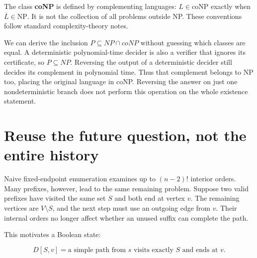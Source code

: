 The class \textbf{coNP} is defined by complementing languages:
\(L\in\mathrm{coNP}\) exactly when \(\overline L\in\mathrm{NP}\). It is
not the collection of all problems outside NP. These conventions follow standard
complexity-theory notes.\cite{TorontoLecture3}

We can derive the inclusion \(P\subseteq NP\cap coNP\) without guessing
which classes are equal. A deterministic polynomial-time decider is also
a verifier that ignores its certificate, so \(P\subseteq NP\). Reversing
the output of a deterministic decider still decides its complement in
polynomial time. Thus that complement belongs to NP too, placing the
original language in coNP. Reversing the answer on just one
nondeterministic branch does not perform this operation on the whole
existence statement.


\section{Reuse the future question, not the entire
history}\label{reuse-the-future-question-not-the-entire-history}

Naive fixed-endpoint enumeration examines up to \((n-2)!\) interior
orders. Many prefixes, however, lead to the same remaining problem.
Suppose two valid prefixes have visited the same set \(S\) and both end
at vertex \(v\). The remaining vertices are \(V\setminus S\), and the
next step must use an outgoing edge from \(v\). Their internal orders no
longer affect whether an unused suffix can complete the path.

This motivates a Boolean state:

\begin{equation}
D[S,v]=\text{a simple path from }s\text{ visits exactly }S\text{ and ends at }v.
\end{equation}


